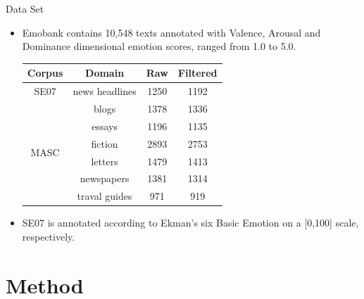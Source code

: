 \documentclass[
 size=14pt,
 paper=smartboard,  %
 mode=present, 		%
 display=slides, 	%
 style=tuliplab,  	%
 pauseslide,
 fleqn,leqno]{powerdot}
\begin{document}
\begin{slide}[toc=,bm=]{Data Set}

\begin{itemize}
\item
Emobank contains 10,548 texts annotated with
Valence, Arousal and Dominance 
dimensional emotion scores, 
ranged from 1.0 to 5.0.
\begin{center}
	\begin{tabular}{ c c c c }
		\toprule
		Corpus & Domain  & Raw & Filtered  \\
		\midrule
		SE07 &  news headlines &  1250 &  1192 \\
		\hline
		\multirow{6}{*}{MASC} &  blogs&  1378&  1336\\
		&  essays &  1196 &  1135 \\
		&  fiction &  2893 &  2753 \\
		&  letters &  1479 &  1413 \\
		& newspapers & 1381 & 1314 \\
		& traval guides & 971 & 919 \\
		\bottomrule
	\end{tabular}
\end{center}

\item 
SE07 is  annotated according to 
Ekman’s six Basic Emotion 
on a [0,100] scale, respectively.

\end{itemize}

\end{slide}

\section{Method}
\end{document}
